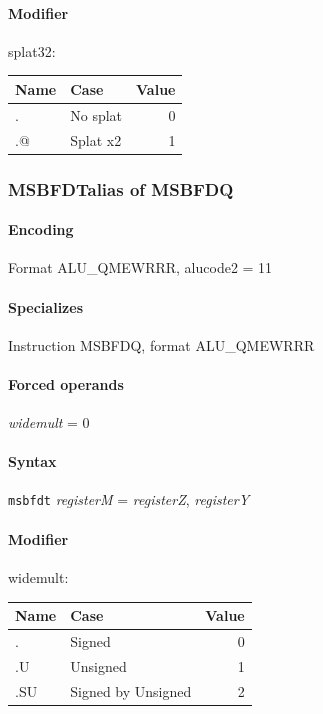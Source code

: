 {\paragraph{Modifier} \textsf{splat32}:\\

\noindent \begin{tabular}{|l|l|r|} \hline
\bf{Name} & \bf{Case} & \bf{Value} \\ \hline
. & No splat & 0 \\
.@ & Splat x2 & 1 \\
\hline \end{tabular}
\newpage
\subsubsection[{\small MSBFDT: alias of MSBFDQ}]{MSBFDT\hfill alias of MSBFDQ}
\label{instr:MSBFDT}

\paragraph{Encoding} Format \textsf{ALU\_QMEWRRR, alucode2 = 11}\\



\paragraph{Specializes} Instruction MSBFDQ, format ALU\_QMEWRRR

\paragraph{Forced operands} \emph{widemult} = 0

\paragraph{Syntax} \texttt{msbfdt} \emph{registerM} = \emph{registerZ}, \emph{registerY}

\paragraph{Modifier} \textsf{widemult}:\\

\noindent \begin{tabular}{|l|l|r|} \hline
\bf{Name} & \bf{Case} & \bf{Value} \\ \hline
. & Signed & 0 \\
.U & Unsigned & 1 \\
.SU & Signed by Unsigned & 2 \\
\hline \end{tabular}
\newpage
}
